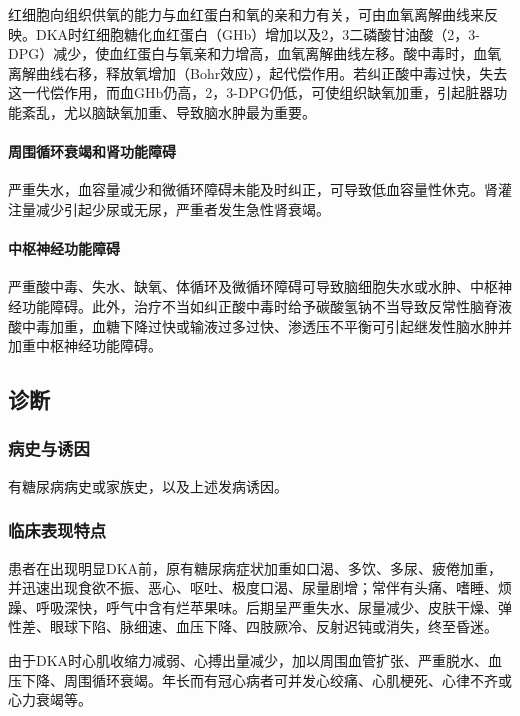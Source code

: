 红细胞向组织供氧的能力与血红蛋白和氧的亲和力有关，可由血氧离解曲线来反映。DKA时红细胞糖化血红蛋白（GHb）增加以及2，3二磷酸甘油酸（2，3-DPG）减少，使血红蛋白与氧亲和力增高，血氧离解曲线左移。酸中毒时，血氧离解曲线右移，释放氧增加（Bohr效应），起代偿作用。若纠正酸中毒过快，失去这一代偿作用，而血GHb仍高，2，3-DPG仍低，可使组织缺氧加重，引起脏器功能紊乱，尤以脑缺氧加重、导致脑水肿最为重要。

\paragraph{周围循环衰竭和肾功能障碍}

严重失水，血容量减少和微循环障碍未能及时纠正，可导致低血容量性休克。肾灌注量减少引起少尿或无尿，严重者发生急性肾衰竭。

\paragraph{中枢神经功能障碍}

严重酸中毒、失水、缺氧、体循环及微循环障碍可导致脑细胞失水或水肿、中枢神经功能障碍。此外，治疗不当如纠正酸中毒时给予碳酸氢钠不当导致反常性脑脊液酸中毒加重，血糖下降过快或输液过多过快、渗透压不平衡可引起继发性脑水肿并加重中枢神经功能障碍。

\subsection{诊断}

\subsubsection{病史与诱因}

有糖尿病病史或家族史，以及上述发病诱因。

\subsubsection{临床表现特点}

患者在出现明显DKA前，原有糖尿病症状加重如口渴、多饮、多尿、疲倦加重，并迅速出现食欲不振、恶心、呕吐、极度口渴、尿量剧增；常伴有头痛、嗜睡、烦躁、呼吸深快，呼气中含有烂苹果味。后期呈严重失水、尿量减少、皮肤干燥、弹性差、眼球下陷、脉细速、血压下降、四肢厥冷、反射迟钝或消失，终至昏迷。

由于DKA时心肌收缩力减弱、心搏出量减少，加以周围血管扩张、严重脱水、血压下降、周围循环衰竭。年长而有冠心病者可并发心绞痛、心肌梗死、心律不齐或心力衰竭等。

